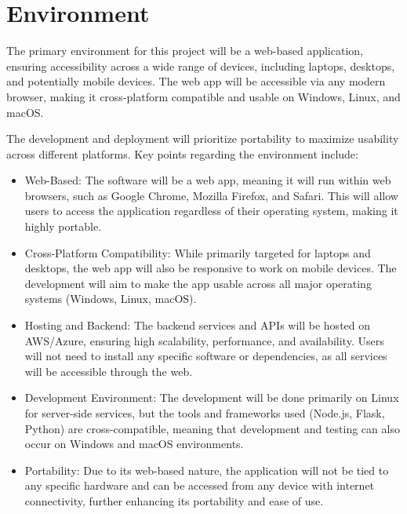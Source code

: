 \documentclass{article}
\begin{document}
\section{Environment}

The primary environment for this project will be a web-based application, ensuring accessibility across a wide range of devices, including laptops, desktops, and potentially mobile devices. The web app will be accessible via any modern browser, making it cross-platform compatible and usable on Windows, Linux, and macOS.

The development and deployment will prioritize portability to maximize usability across different platforms. Key points regarding the environment include:

\begin{itemize}
    \item Web-Based: The software will be a web app, meaning it will run within web browsers, such as Google Chrome, Mozilla Firefox, and Safari. This will allow users to access the application regardless of their operating system, making it highly portable.
    
    \item Cross-Platform Compatibility: While primarily targeted for laptops and desktops, the web app will also be responsive to work on mobile devices. The development will aim to make the app usable across all major operating systems (Windows, Linux, macOS).

    \item Hosting and Backend: The backend services and APIs will be hosted on AWS/Azure, ensuring high scalability, performance, and availability. Users will not need to install any specific software or dependencies, as all services will be accessible through the web.

    \item Development Environment: The development will be done primarily on Linux for server-side services, but the tools and frameworks used (Node.js, Flask, Python) are cross-compatible, meaning that development and testing can also occur on Windows and macOS environments.

    \item Portability: Due to its web-based nature, the application will not be tied to any specific hardware and can be accessed from any device with internet connectivity, further enhancing its portability and ease of use.
\end{itemize}
\end{document}
